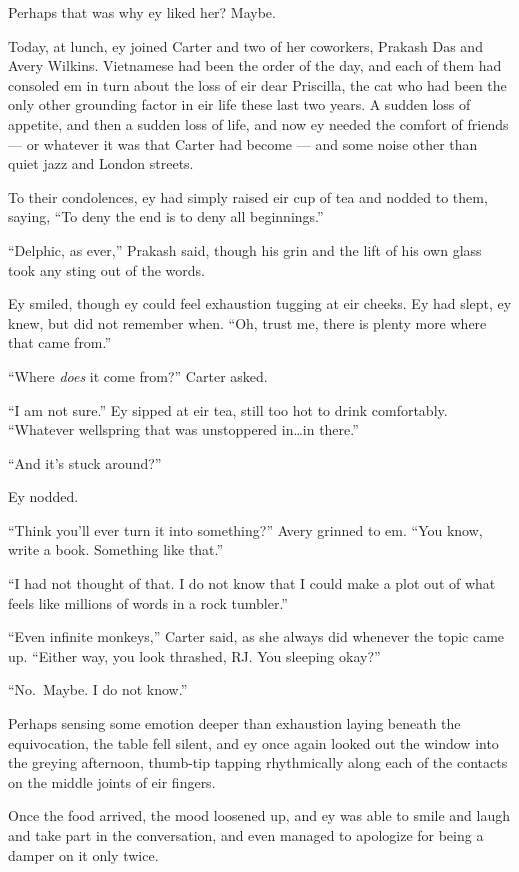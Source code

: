 Perhaps that was why ey liked her? Maybe.

Today, at lunch, ey joined Carter and two of her coworkers, Prakash Das and Avery Wilkins. Vietnamese had been the order of the day, and each of them had consoled em in turn about the loss of eir dear Priscilla, the cat who had been the only other grounding factor in eir life these last two years. A sudden loss of appetite, and then a sudden loss of life, and now ey needed the comfort of friends — or whatever it was that Carter had become — and some noise other than quiet jazz and London streets.

To their condolences, ey had simply raised eir cup of tea and nodded to them, saying, ``To deny the end is to deny all beginnings.''

``Delphic, as ever,'' Prakash said, though his grin and the lift of his own glass took any sting out of the words.

Ey smiled, though ey could feel exhaustion tugging at eir cheeks. Ey had slept, ey knew, but did not remember when. ``Oh, trust me, there is plenty more where that came from.''

``Where \emph{does} it come from?'' Carter asked.

``I am not sure.'' Ey sipped at eir tea, still too hot to drink comfortably. ``Whatever wellspring that was unstoppered in\ldots in there.''

``And it's stuck around?''

Ey nodded.

``Think you'll ever turn it into something?'' Avery grinned to em. ``You know, write a book. Something like that.''

``I had not thought of that. I do not know that I could make a plot out of what feels like millions of words in a rock tumbler.''

``Even infinite monkeys,'' Carter said, as she always did whenever the topic came up. ``Either way, you look thrashed, RJ. You sleeping okay?''

``No.~Maybe. I do not know.''

Perhaps sensing some emotion deeper than exhaustion laying beneath the equivocation, the table fell silent, and ey once again looked out the window into the greying afternoon, thumb-tip tapping rhythmically along each of the contacts on the middle joints of eir fingers.

Once the food arrived, the mood loosened up, and ey was able to smile and laugh and take part in the conversation, and even managed to apologize for being a damper on it only twice.

